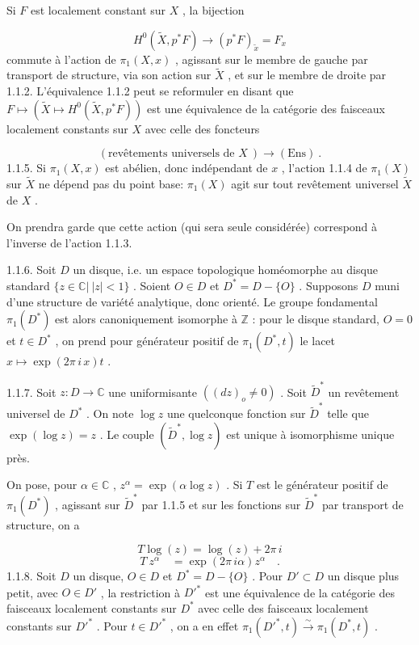 Si $F$ est localement constant sur $X$ , la bijection

\begin{equation}\tag{1.1.4.1}
H^{0}(\tilde{X}, p^{*} F) \longrightarrow (p^{*}F)_{\tilde{x}} = F_{x}
\end{equation}
commute à l'action de $\pi_1(X, x)$ , agissant sur le membre de gauche par transport de structure, via son action sur $\tilde{X}$ , et sur le membre de droite par 1.1.2. L'équivalence 1.1.2 peut se reformuler en disant que $F \longmapsto (\tilde{X} \longmapsto H^{0}(\tilde{X}, p^{*}F))$ est une équivalence de la catégorie des faisceaux localement constants sur $X$ avec celle des foncteurs

\begin{equation*}
(\text{revêtements universels de } X\ ) \longrightarrow (\mathrm{Ens})\ .
\end{equation*}
1.1.5. Si $\pi_1(X, x)$ est abélien, donc indépendant de $x$ , l'action 1.1.4 de $\pi_1(X)$ sur $\tilde{X}$ ne dépend pas du point base: $\pi_1(X)$ agit sur tout revêtement universel $\tilde{X}$ de $X$ .

On prendra garde que cette action (qui sera seule considérée) correspond à l'inverse de l'action 1.1.3.

1.1.6. Soit $D$ un disque, i.e. un espace topologique homéomorphe au disque standard $\{z \in \mathbb{C}|\ |z| < 1\}$ . Soient $O \in D$ et $D^{*} = D -\{O\}$ . Supposons $D$ muni d'une structure de variété analytique, donc orienté. Le groupe fondamental $\pi_1(D^{*})$ est alors canoniquement isomorphe à $\mathbb{Z}$ : pour le disque standard, $O = 0$ et $t \in D^{*}$ , on prend pour générateur positif de $\pi_1(D^{*}, t)$ le lacet $x \longmapsto \exp(2\pi\, i\, x)t$ .

1.1.7. Soit $z : D \to \mathbb{C}$ une uniformisante $((dz)_{o} \neq 0)$ . Soit $\tilde{D}^{*}$ un revêtement universel de $D^{*}$ . On note $\log z$ une quelconque fonction sur $\tilde{D}^{*}$ telle que
$\exp(\log z) = z$ . Le couple $(\tilde{D}^{*}, \log z)$ est unique à isomorphisme unique près.

On pose, pour $\alpha \in \mathbb{C}$ , $z^{\alpha} = \exp(\alpha \log z)$ . Si $T$ est le générateur positif de $\pi_1(D^{*})$ , agissant sur $\tilde{D}^{*}$ par 1.1.5 et sur les fonctions sur $\tilde{D}^{*}$ par transport de structure, on a

\begin{equation}\tag{1.1.7.1}
T \log(z) = \log(z) + 2\pi\, i
\end{equation}
\begin{equation}\tag{1.1.7.2}
T\ z^{\alpha} \quad = \exp(2\pi\, i\alpha)z^{\alpha} \quad .
\end{equation}
1.1.8. Soit $D$ un disque, $O \in D$ et $D^{*} = D-\{O\}$ . Pour $D' \subset D$ un disque plus petit, avec $O \in D'$ , la restriction à ${D'}^{*}$ est une équivalence de la catégorie des faisceaux localement constants sur $D^{*}$ avec celle des faisceaux localement constants sur ${D'}^{*}$ . Pour $t \in {D'}^{*}$ , on a en effet $\pi_1({D'}^{*}, t) \overset{\sim}{\longrightarrow} \pi_1(D^{*}, t)$ .

